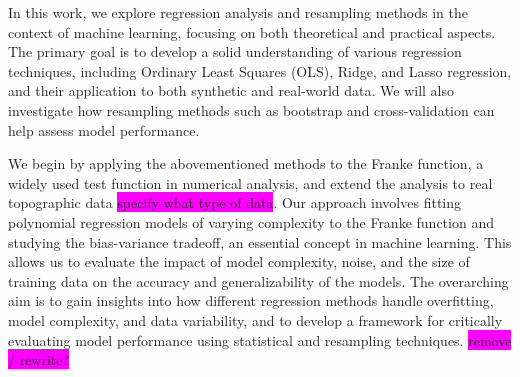 \documentclass[aps,pra,english,notitlepage,reprint,nofootinbib]{revtex4-1}  %
\begin{document}


In this work, we explore regression analysis and resampling methods in the context of machine learning, focusing on both theoretical and practical aspects. The primary goal is to develop a solid understanding of various regression techniques, including Ordinary Least Squares (OLS), Ridge, and Lasso regression, and their application to both synthetic and real-world data. We will also investigate how resampling methods such as bootstrap and cross-validation can help assess model performance.

We begin by applying the abovementioned methods to the Franke function, a widely used test function in numerical analysis, and extend the analysis to real topographic data \colorbox{magenta}{specify what type of data}. Our approach involves fitting polynomial regression models of varying complexity to the Franke function and studying the bias-variance tradeoff, an essential concept in machine learning. This allows us to evaluate the impact of model complexity, noise, and the size of training data on the accuracy and generalizability of the models. The overarching aim is to gain insights into how different regression methods handle overfitting, model complexity, and data variability, and to develop a framework for critically evaluating model performance using statistical and resampling techniques. \colorbox{magenta}{remove / rewrite?}
\end{document}
